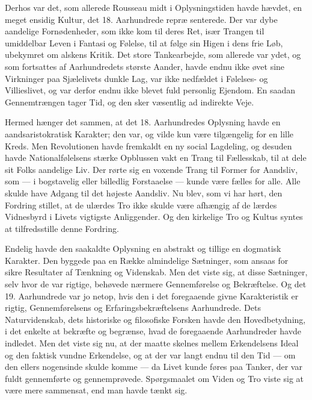 \documentclass[12pt,a4paper,openany]{book}
\newcommand{\opage}[1]{\marginnote{\footnotesize\textit{[#1]}}}
\begin{document}
Derhos var det, som allerede Rousseau midt i Oplysningstiden
havde hævdet, en meget ensidig Kultur, det 18. Aarhundrede repræ%
\opage{121}senterede. Der var dybe aandelige Fornødenheder, som ikke kom
til deres Ret, især Trangen til umiddelbar Leven i Fantasi og Følelse,
til at følge sin Higen i dens frie Løb, ubekymret om alskens
Kritik. Det store Tankearbejde, som allerede var ydet, og som fortsattes
af Aarhundredets største Aander, havde endnu ikke øvet sine
Virkninger paa Sjælelivets dunkle Lag, var ikke nedfældet i Følelses-
og Villieslivet, og var derfor endnu ikke blevet fuld personlig
Ejendom. En saadan Gennemtrængen tager Tid, og den sker væsentlig
ad indirekte Veje.

Hermed hænger det sammen, at det 18. Aarhundredes Oplysning
havde en aandsaristokratisk Karakter; den var, og vilde kun være
tilgængelig for en lille Kreds. Men Revolutionen havde fremkaldt en
ny social Lagdeling, og desuden havde Nationalfølelsens stærke Opblussen
vakt en Trang til Fællesskab, til at dele sit Folks aandelige
Liv. Der rørte sig en voxende Trang til Former for Aandsliv, som
--- i bogstavelig eller billedlig Forstaaelse --- kunde være fælles for
alle. Alle skulde have Adgang til det højeste Aandsliv. Nu blev, som
vi har hørt, den Fordring stillet, at de ulærdes Tro ikke skulde være
afhængig af de lærdes Vidnesbyrd i Livets vigtigste Anliggender. Og
den kirkelige Tro og Kultus syntes at tilfredsstille denne Fordring.

Endelig havde den saakaldte Oplysning en abstrakt og tillige en
dogmatisk Karakter. Den byggede paa en Række almindelige Sætninger,
som ansaas for sikre Resultater af Tænkning og Videnskab. Men
det viste sig, at disse Sætninger, selv hvor de var rigtige, behøvede
nærmere Gennemførelse og Bekræftelse. Og det 19. Aarhundrede var
jo netop, hvis den i det foregaaende givne Karakteristik er rigtig,
Gennemførelsens og Erfaringsbekræftelsens Aarhundrede. Dets Naturvidenskab,
dets historiske og filosofiske Forsken havde den Hovedbetydning,
i det enkelte at bekræfte og begrænse, hvad de foregaaende
Aarhundreder havde indledet. Men det viste sig nu, at der
maatte skelnes mellem Erkendelsens Ideal og den faktisk vundne
Erkendelse, og at der var langt endnu til den Tid --- om den ellers
nogensinde skulde komme --- da Livet kunde føres paa Tanker, der
var fuldt gennemførte og gennemprøvede. Spørgsmaalet om Viden
og Tro viste sig at være mere sammensat, end man havde
tænkt sig.
\end{document}
